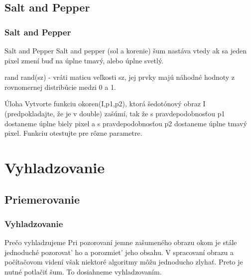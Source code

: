\documentclass{beamer}
\begin{document}
\subsection{Salt and Pepper}
\begin{frame}
\frametitle{Salt and Pepper}
\begin{block}{Salt and Pepper}
Salt and pepper (sol a korenie) šum nastáva vtedy ak sa jeden pixel zmení buď na úplne tmavý, alebo úplne svetlý.
\end{block}

\begin{block}{rand}
rand(sz) - vráti maticu veľkosti sz, jej prvky majú náhodné hodnoty z rovnomernej distribúcie medzi 0 a 1.
\end{block}


\begin{block}{Úloha}
Vytvorte funkciu okoren(I,p1,p2), ktorá šedotónový obraz I (predpokladajte, že je v double) zašúmí, tak že s pravdepodobnosťou p1 dostaneme úplne biely pixel a s pravdepodobnosťou p2 dostaneme úplne tmavý pixel. Funkciu otestujte pre rôzne parametre.
\end{block}
\end{frame}


\section{Vyhladzovanie}
\subsection{Priemerovanie}
\begin{frame}
\frametitle{Vyhladzovanie}
\begin{block}{Prečo vyhladzujeme}
Pri pozorovaní jemne zašumeného obrazu okom je stále jednoduché pozorovat' ho a porozmiet' jeho obsahu. V spracovaní obrazu a počítačovom videní však niektoré algoritmy môžu jednoducho zlyhať. Preto je nutné potlačiť šum. To dosiahneme vyhladzovaním.
\end{block}
\end{frame}
\end{document}

